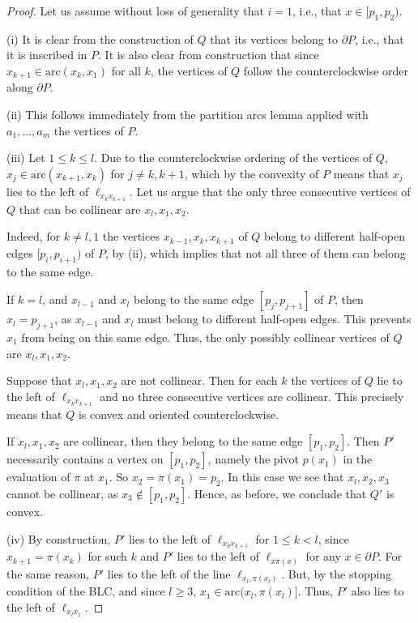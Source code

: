 \documentclass[11pt]{amsart}
\theoremstyle{remark}
\numberwithin{equation}{section}
\newcommand{\arc}{\mathrm{arc}}
\renewcommand{\leq}{\leqslant}
\renewcommand{\geq}{\geqslant}
\begin{document}
\begin{proof}
Let us assume without loss of generality that $i=1$, i.e., that $x\in [p_1,p_2)$. 

(i) It is clear from the construction of $Q$ that its vertices belong to $\partial P$, i.e., that it is inscribed in $P$. It is also clear from construction that since $x_{k+1}\in \arc(x_k,x_1)$ for all $k$,  the vertices of $Q$ follow the counterclockwise order along $\partial P$. 

(ii) This follows immediately from  the partition arcs lemma applied with $a_1,\dots,a_m$ the vertices of $P$.


(iii) Let $1\leq k \leq l$. Due to the counterclockwise ordering of the vertices of $Q$,  $x_j\in \arc(x_{k+1},x_k)$ for $j\neq k,k+1$, which by the convexity of $P$ means that $x_j$ lies to the left of $\ell_{x_kx_{k+1}}$. Let us argue that the only three consecutive vertices of $Q$ that can be collinear are $x_l,x_1,x_2$. 

Indeed, for $k\neq l,1$  the vertices $x_{k-1},x_k,x_{k+1}$ of $Q$ belong to 
different half-open edges  $[p_i,p_{i+1})$ of $P$, by (ii), which implies that not all three of them can belong to the same edge.

If $k=l$, and $x_{l-1}$ and $x_l$ belong to the same edge $[p_j,p_{j+1}]$ of $P$, then  $x_l=p_{j+1}$, as $x_{l-1}$ and $x_l$ must belong to different half-open edges. This prevents $x_1$ from being on this same edge. Thus, the only possibly collinear vertices of $Q$ are $x_{l},x_1,x_2$.

Suppose that $x_l,x_1,x_2$ are not collinear. Then  for each $k$ the vertices of $Q$  lie  to the left of $\ell_{x_kx_{k+1}}$ and no three consecutive vertices are collinear. This precisely means that $Q$ is convex  and oriented counterclockwise. 

If $x_l,x_1,x_2$ are collinear, then they belong to the same edge $[p_1,p_2]$. Then $P'$ necessarily  contains a vertex on $[p_1,p_2]$, namely the pivot $p(x_1)$ in the evaluation of $\pi$ at $x_1$. So $x_2=\pi(x_1)=p_2$. In this case we see that $x_l,x_2,x_3$ cannot be collinear, as $x_3\notin [p_1,p_2]$. Hence, as before, we conclude that $Q'$ is convex.

(iv)  By construction, $P'$ lies to the left of $\ell_{x_kx_{k+1}}$ for $1\leq k<l$, since  $x_{k+1}=\pi(x_k)$ for such $k$ and $P'$
lies to the left of $\ell_{x\pi(x)}$ for any $x\in \partial P$. For the same reason, $P'$ lies to the left of the line $\ell_{x_l,\pi(x_l)}$. But, by the stopping condition of the BLC, and since $l\geq 3$, $x_1 \in \arc(x_{l},\pi(x_{l})]$. Thus, $P'$ also lies to the left of $\ell_{x_lx_1}$. 


\end{proof}
\end{document}
